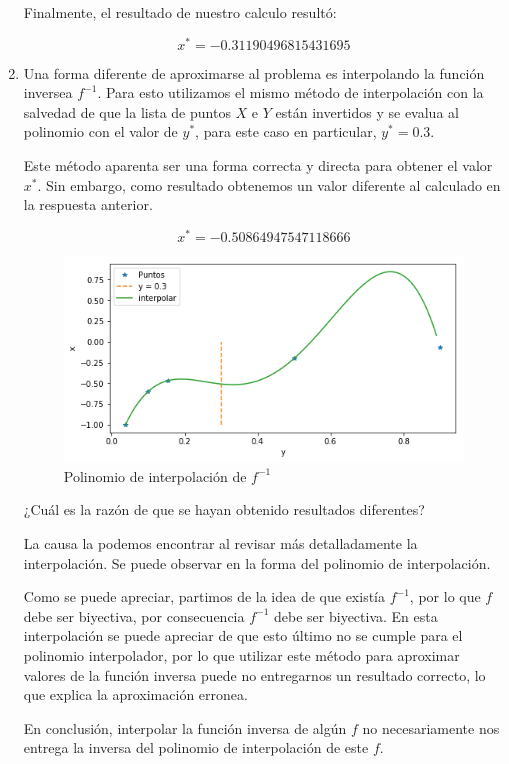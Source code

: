 \documentclass[spanish, fleqn]{article}
\begin{document}
\begin{enumerate}
  
	Finalmente, el resultado de nuestro calculo resultó:
	
		$$x^* = -0.31190496815431695$$  
  
  \item %
  
  Una forma diferente de aproximarse al problema es interpolando la función inversea $f^{-1}$. Para esto utilizamos el mismo método de interpolación con la salvedad de que la lista de puntos $X$ e $Y$ están invertidos y se evalua al polinomio con el valor de $y^*$, para este caso en particular, $y^* = 0.3$.
  
  Este método aparenta ser una forma correcta y directa para obtener el valor $x^*$. Sin embargo, como resultado obtenemos un valor diferente al calculado en la respuesta anterior.
  
  $$x^* = -0.50864947547118666$$
  
   \begin{figure}[h]
	\caption{Polinomio de interpolación de $f^{-1}$}   
	\centering
 	\includegraphics[scale=0.6]{interpolacioninversa.png}
   \end{figure}
  
  
  ¿Cuál es la razón de que  se hayan obtenido resultados diferentes?
  
   La causa la podemos encontrar al revisar más detalladamente la interpolación. Se puede observar en la forma del polinomio de interpolación.
     
  Como se puede apreciar, partimos de la idea de que existía $f^{-1}$, por lo que $f$ debe ser biyectiva, por consecuencia $f^{-1}$ debe ser biyectiva. En esta interpolación se puede apreciar de que esto último no se cumple para el polinomio interpolador, por lo que utilizar este método para aproximar valores de la función inversa puede no entregarnos un resultado correcto, lo que explica la aproximación erronea.
  
   En conclusión, interpolar la función inversa de algún $f$ no necesariamente nos entrega la inversa del polinomio de interpolación de este $f$.
  \end{enumerate}
\end{document}

